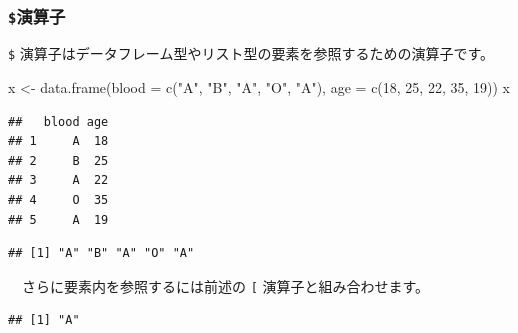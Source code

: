 \documentclass[
  12pt,
]{book}
\newenvironment{Shaded}{\begin{snugshade}}{\end{snugshade}}
\newcommand{\AttributeTok}[1]{\textcolor[rgb]{0.77,0.63,0.00}{#1}}
\newcommand{\DecValTok}[1]{\textcolor[rgb]{0.00,0.00,0.81}{#1}}
\newcommand{\FunctionTok}[1]{\textcolor[rgb]{0.00,0.00,0.00}{#1}}
\newcommand{\NormalTok}[1]{#1}
\newcommand{\OtherTok}[1]{\textcolor[rgb]{0.56,0.35,0.01}{#1}}
\newcommand{\SpecialCharTok}[1]{\textcolor[rgb]{0.00,0.00,0.00}{#1}}
\newcommand{\StringTok}[1]{\textcolor[rgb]{0.31,0.60,0.02}{#1}}
\begin{document}
　

\hypertarget{ux6f14ux7b97ux5b50-2}{%
\subsubsection{\texorpdfstring{\texttt{\$}演算子}{\$演算子}}\label{ux6f14ux7b97ux5b50-2}}

\texttt{\$} 演算子はデータフレーム型やリスト型の要素を参照するための演算子です。

\begin{Shaded}
\begin{Highlighting}[numbers=left,,]
\NormalTok{x }\OtherTok{\textless{}{-}} \FunctionTok{data.frame}\NormalTok{(}\AttributeTok{blood =} \FunctionTok{c}\NormalTok{(}\StringTok{"A"}\NormalTok{, }\StringTok{"B"}\NormalTok{, }\StringTok{"A"}\NormalTok{, }\StringTok{"O"}\NormalTok{, }\StringTok{"A"}\NormalTok{), }\AttributeTok{age =} \FunctionTok{c}\NormalTok{(}\DecValTok{18}\NormalTok{, }\DecValTok{25}\NormalTok{, }\DecValTok{22}\NormalTok{, }\DecValTok{35}\NormalTok{, }\DecValTok{19}\NormalTok{))}
\NormalTok{x}
\end{Highlighting}
\end{Shaded}

\begin{verbatim}
##   blood age
## 1     A  18
## 2     B  25
## 3     A  22
## 4     O  35
## 5     A  19
\end{verbatim}

\begin{Shaded}
\end{Shaded}

\begin{verbatim}
## [1] "A" "B" "A" "O" "A"
\end{verbatim}

　さらに要素内を参照するには前述の \texttt{{[}} 演算子と組み合わせます。

\begin{Shaded}
\end{Shaded}

\begin{verbatim}
## [1] "A"
\end{verbatim}
\end{document}
